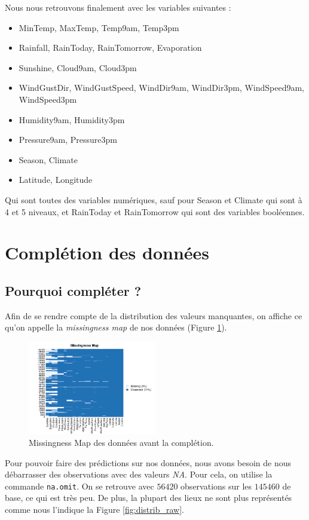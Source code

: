 \documentclass{article}
\begin{document}
Nous nous retrouvons finalement avec les variables suivantes : 
\begin{itemize}
    \item MinTemp, MaxTemp, Temp9am, Temp3pm
    \item Rainfall, RainToday, RainTomorrow, Evaporation
    \item Sunshine, Cloud9am, Cloud3pm
    \item WindGustDir, WindGustSpeed, WindDir9am, WindDir3pm, WindSpeed9am, WindSpeed3pm
    \item Humidity9am, Humidity3pm
    \item Pressure9am, Pressure3pm
    \item Season, Climate
    \item Latitude, Longitude
\end{itemize}
Qui sont toutes des variables numériques, sauf pour Season et Climate qui sont à 4 et 5 niveaux, et RainToday et RainTomorrow qui sont des variables booléennes.

\section{Complétion des données}

\subsection{Pourquoi compléter ?}

Afin de se rendre compte de la distribution des valeurs manquantes, on affiche ce qu'on appelle la \emph{missingness map} de nos données (Figure \ref{fig:missingness_raw}).

\begin{figure}[htp]
    \centering
    \includegraphics[width=0.5\textwidth]{Images/missmap.png}
    \caption{Missingness Map des données avant la complétion.}
    \label{fig:missingness_raw}
\end{figure}

Pour pouvoir faire des prédictions sur nos données, nous avons besoin de nous débarrasser des observations avec des valeurs \emph{NA}. Pour cela, on utilise la commande \texttt{na.omit}. On se retrouve avec $56420$ observations sur les $145460$ de base, ce qui est très peu. De plus, la plupart des lieux ne sont plus représentés comme nous l'indique la Figure \ref{fig:distrib_raw}.
\end{document}
